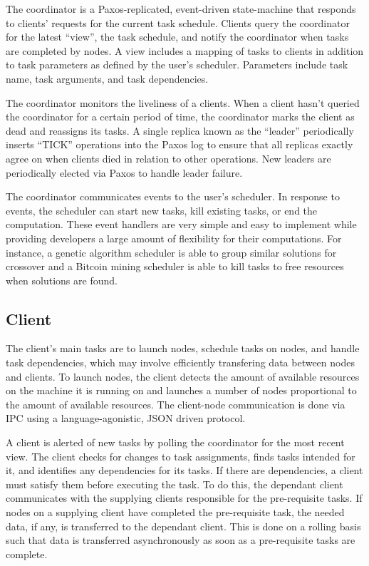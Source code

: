 \documentclass [11pt, twocolumn] {article}
\begin{document}
The coordinator is a Paxos-replicated, event-driven state-machine that responds to clients' requests for the current task schedule. Clients query the coordinator for the latest ``view'', the task schedule, and notify the coordinator when tasks are completed by nodes. A view includes a mapping of tasks to clients in addition to task parameters as defined by the user's scheduler. Parameters include task name, task arguments, and task dependencies. 

The coordinator monitors the liveliness of a clients. When a client hasn't queried the coordinator for a certain period of time, the coordinator marks the client as dead and reassigns its tasks. A single replica known as the ``leader'' periodically inserts ``TICK'' operations into the Paxos log to ensure that all replicas exactly agree on when clients died in relation to other operations. New leaders are periodically elected via Paxos to handle leader failure.

The coordinator communicates events to the user's scheduler. In response to events, the scheduler can start new tasks, kill existing tasks, or end the computation. These event handlers are very simple and easy to implement while providing developers a large amount of flexibility for their computations. For instance, a genetic algorithm scheduler is able to group similar solutions for crossover and a Bitcoin mining scheduler is able to kill tasks to free resources when solutions are found.

\subsection {Client}

The client's main tasks are to launch nodes, schedule tasks on nodes, and handle task dependencies, which may involve efficiently transfering data between nodes and clients. To launch nodes, the client detects the amount of available resources on the machine it is running on and launches a number of nodes proportional to the amount of available resources. The client-node communication is done via IPC using a language-agonistic, JSON driven protocol.

A client is alerted of new tasks by polling the coordinator for the most recent view. The client checks for changes to task assignments, finds tasks intended for it, and identifies any dependencies for its tasks. If there are dependencies, a client must satisfy them before executing the task. To do this, the dependant client communicates with the supplying clients responsible for the pre-requisite tasks. If nodes on a supplying client have completed the pre-requisite task, the needed data, if any, is transferred to the dependant client. This is done on a rolling basis such that data is transferred asynchronously as soon as a pre-requisite tasks are complete.
\end{document}
